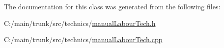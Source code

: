 The documentation for this class was generated from the following files:\begin{DoxyCompactItemize}
\item 
C:/main/trunk/src/technics/\hyperlink{manual_labour_tech_8h}{manualLabourTech.h}\item 
C:/main/trunk/src/technics/\hyperlink{manual_labour_tech_8cpp}{manualLabourTech.cpp}\end{DoxyCompactItemize}
